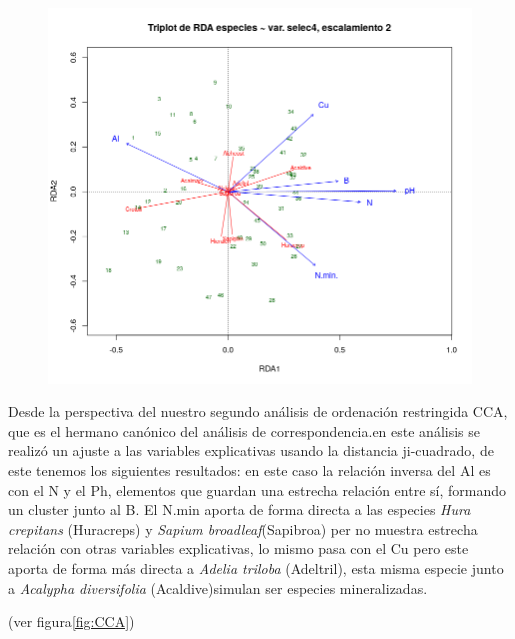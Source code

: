 \documentclass[11pt,]{article}
\begin{document}
\begin{figure}
\centering
\includegraphics{PCA_RDA.png}
\caption{\label{fig:PCA_RDA}}
\end{figure}

Desde la perspectiva del nuestro segundo análisis de ordenación
restringida CCA, que es el hermano canónico del análisis de
correspondencia.en este análisis se realizó un ajuste a las variables
explicativas usando la distancia ji-cuadrado, de este tenemos los
siguientes resultados: en este caso la relación inversa del Al es con el
N y el Ph, elementos que guardan una estrecha relación entre sí,
formando un cluster junto al B. El N.min aporta de forma directa a las
especies \emph{Hura crepitans} (Huracreps) y \emph{Sapium
broadleaf}(Sapibroa) per no muestra estrecha relación con otras
variables explicativas, lo mismo pasa con el Cu pero este aporta de
forma más directa a \emph{Adelia triloba} (Adeltril), esta misma especie
junto a \emph{Acalypha diversifolia} (Acaldive)simulan ser especies
mineralizadas.

(ver figura\ref{fig:CCA})
\end{document}
